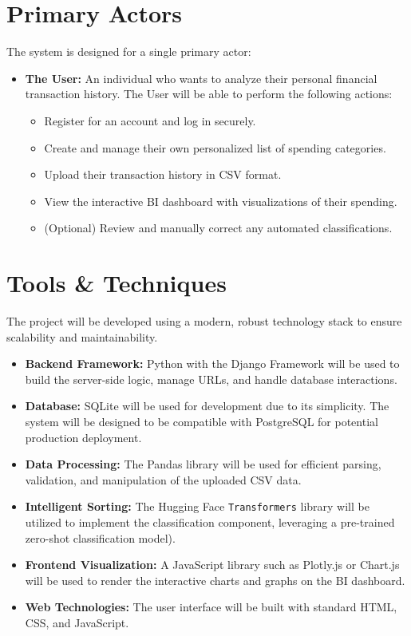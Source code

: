 \documentclass[11pt,a4paper]{report}
\begin{document}
\section{Primary Actors}
The system is designed for a single primary actor:
\begin{itemize}
	\item \textbf{The User:} An individual who wants to analyze their personal financial transaction history. The User will be able to perform the following actions:
	\begin{itemize}
		\item Register for an account and log in securely.
		\item Create and manage their own personalized list of spending categories.
		\item Upload their transaction history in CSV format.
		\item View the interactive BI dashboard with visualizations of their spending.
		\item (Optional) Review and manually correct any automated classifications.
	\end{itemize}
\end{itemize}

\section{Tools \& Techniques}
The project will be developed using a modern, robust technology stack to ensure scalability and maintainability.
\begin{itemize}
	\item \textbf{Backend Framework:} Python with the Django Framework will be used to build the server-side logic, manage URLs, and handle database interactions.
	\item \textbf{Database:} SQLite will be used for development due to its simplicity. The system will be designed to be compatible with PostgreSQL for potential production deployment.
	\item \textbf{Data Processing:} The Pandas library will be used for efficient parsing, validation, and manipulation of the uploaded CSV data.
	\item \textbf{Intelligent Sorting:} The Hugging Face \texttt{Transformers} library will be utilized to implement the classification component, leveraging a pre-trained zero-shot classification model).
	\item \textbf{Frontend Visualization:} A JavaScript library such as Plotly.js or Chart.js will be used to render the interactive charts and graphs on the BI dashboard.
	\item \textbf{Web Technologies:} The user interface will be built with standard HTML, CSS, and JavaScript.
\end{itemize}
\end{document}
